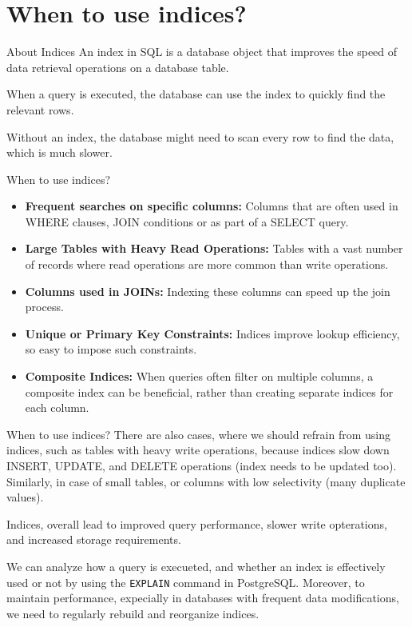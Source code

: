 \documentclass[Serif, 10pt, brown]{beamer}
\theoremstyle{example}
\theoremstyle{plain}
\begin{document}
\section{When to use indices?}
\begin{frame}{About Indices}
	An index in SQL is a database object that improves the speed of data retrieval operations on a database table. 

	\vspace{1cm}

	When a query is executed, the database can use the index to quickly find the relevant rows. 

	\vspace{1cm}

	Without an index, the database might need to scan every row to find the data, which is much slower.
\end{frame}

\begin{frame}{When to use indices?}
	\begin{itemize}
		\item {\bf Frequent searches on specific columns:} Columns that are often used in WHERE clauses, JOIN conditions or as part of a SELECT query.
		\item {\bf Large Tables with Heavy Read Operations:} Tables with a vast number of records where read operations are more common than write operations.
		\item {\bf Columns used in JOINs:} Indexing these columns can speed up the join process.
		\item {\bf Unique or Primary Key Constraints:} Indices improve lookup efficiency, so easy to impose such constraints.
		\item {\bf Composite Indices:} When queries often filter on multiple columns, a composite index can be beneficial, rather than creating separate indices for each column.
	\end{itemize}
\end{frame}

\begin{frame}{When to use indices?}
	There are also cases, where we should refrain from using indices, such as tables with heavy write operations, because indices slow down INSERT, UPDATE, and DELETE operations (index needs to be updated too). Similarly, in case of small tables, or columns with low selectivity (many duplicate values).

	\vspace{1cm}

	Indices, overall lead to improved query performance, slower write opterations, and increased storage requirements.
	
	\vspace{1cm}

	We can analyze how a query is execueted, and whether an index is effectively used or not by using the \texttt{EXPLAIN} command in PostgreSQL. Moreover, to maintain performance, expecially in databases with frequent data modifications, we need to regularly rebuild and reorganize indices.
\end{frame}
\end{document}
